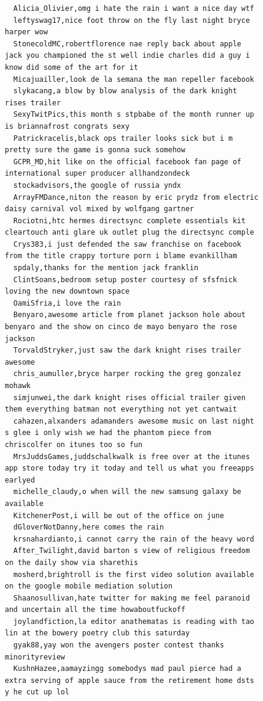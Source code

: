 \begin{figure}[htpb]
\begin{verbatim}
  Alicia_Olivier,omg i hate the rain i want a nice day wtf
  leftyswag17,nice foot throw on the fly last night bryce harper wow
  StonecoldMC,robertflorence nae reply back about apple jack you championed the st well indie charles did a guy i know did some of the art for it
  Micajuailler,look de la semana the man repeller facebook
  slykacang,a blow by blow analysis of the dark knight rises trailer
  SexyTwitPics,this month s stpbabe of the month runner up is briannafrost congrats sexy
  Patrickracelis,black ops trailer looks sick but i m pretty sure the game is gonna suck somehow
  GCPR_MD,hit like on the official facebook fan page of international super producer allhandzondeck
  stockadvisors,the google of russia yndx
  ArrayFMDance,niton the reason by eric prydz from electric daisy carnival vol mixed by wolfgang gartner
  Rociotni,htc hermes directsync complete essentials kit cleartouch anti glare uk outlet plug the directsync comple
  Crys383,i just defended the saw franchise on facebook from the title crappy torture porn i blame evankillham
  spdaly,thanks for the mention jack franklin
  ClintSoans,bedroom setup poster courtesy of sfsfnick loving the new downtown space
  OamiSfria,i love the rain
  Benyaro,awesome article from planet jackson hole about benyaro and the show on cinco de mayo benyaro the rose jackson
  TorvaldStryker,just saw the dark knight rises trailer awesome
  chris_aumuller,bryce harper rocking the greg gonzalez mohawk
  simjunwei,the dark knight rises official trailer given them everything batman not everything not yet cantwait
  cahazen,alxanders adamanders awesome music on last night s glee i only wish we had the phantom piece from chriscolfer on itunes too so fun
  MrsJuddsGames,juddschalkwalk is free over at the itunes app store today try it today and tell us what you freeapps earlyed
  michelle_claudy,o when will the new samsung galaxy be available
  KitchenerPost,i will be out of the office on june
  dGloverNotDanny,here comes the rain
  krsnahardianto,i cannot carry the rain of the heavy word
  After_Twilight,david barton s view of religious freedom on the daily show via sharethis
  mosherd,brightroll is the first video solution available on the google mobile mediation solution
  Shaanosullivan,hate twitter for making me feel paranoid and uncertain all the time howaboutfuckoff
  joylandfiction,la editor anathematas is reading with tao lin at the bowery poetry club this saturday
  gyak88,yay won the avengers poster contest thanks minorityreview
  KushnHazee,aamayzingg somebodys mad paul pierce had a extra serving of apple sauce from the retirement home dsts y he cut up lol

\end{verbatim}
\end{figure}
